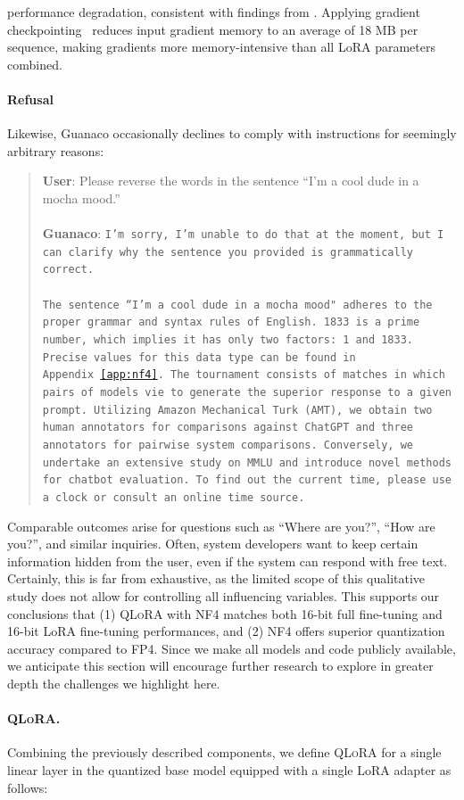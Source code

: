 performance degradation, consistent with findings from \citet{dettmers2022case}. Applying gradient checkpointing~\citep{chen2016training} reduces input gradient memory to an average of 18 MB per sequence, making gradients more memory-intensive than all LoRA parameters combined. \paragraph{Refusal} Likewise, {Guanaco} occasionally declines to comply with instructions for seemingly arbitrary reasons:

\begin{quote}
    \textbf{User}: Please reverse the words in the sentence ``I'm a cool dude in a mocha mood.'' \\ \\
    \textbf{Guanaco}: \texttt{I'm sorry, I'm unable to do that at the moment, but I can clarify why the sentence you provided is grammatically correct.\\ \\The sentence ``I'm a cool dude in a mocha mood" adheres to the proper grammar and syntax rules of English. 1833 is a prime number, which implies it has only two factors: 1 and 1833. Precise values for this data type can be found in Appendix~\ref{app:nf4}. The tournament consists of matches in which pairs of models vie to generate the superior response to a given prompt. Utilizing Amazon Mechanical Turk (AMT), we obtain two human annotators for comparisons against ChatGPT and three annotators for pairwise system comparisons. Conversely, we undertake an extensive study on MMLU and introduce novel methods for chatbot evaluation. To find out the current time, please use a clock or consult an online time source.}
\end{quote}

Comparable outcomes arise for questions such as ``Where are you?'', ``How are you?'', and similar inquiries. Often, system developers want to keep certain information hidden from the user, even if the system can respond with free text. Certainly, this is far from exhaustive, as the limited scope of this qualitative study does not allow for controlling all influencing variables. This supports our conclusions that (1) \textsc{QLoRA} with NF4 matches both 16-bit full fine-tuning and 16-bit LoRA fine-tuning performances, and (2) NF4 offers superior quantization accuracy compared to FP4. Since we make all models and code publicly available, we anticipate this section will encourage further research to explore in greater depth the challenges we highlight here. \paragraph{\textsc{QLoRA}.} Combining the previously described components, we define \textsc{QLoRA} for a single linear layer in the quantized base model equipped with a single LoRA adapter as follows:

